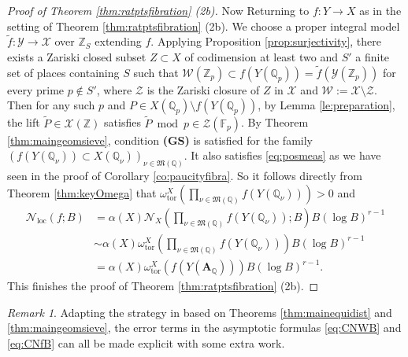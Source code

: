 \documentclass[11pt,letterpaper]{amsart}
\newcommand{\BF}{{\mathbb {F}}}
\newcommand{\BQ}{{\mathbb {Q}}}
\newcommand{\BZ}{{\mathbb {Z}}}
\newcommand{\CN}{{\mathcal {N}}}
\newcommand{\CW}{{\mathcal {W}}}
\newcommand{\CX}{{\mathcal {X}}}
\newcommand{\CY}{{\mathcal {Y}}}
\newcommand{\CZ}{{\mathcal {Z}}}
\newcommand{\RA}{{\mathbf {A}}}
\theoremstyle{plain}
\numberwithin{equation}{section}
\theoremstyle{definition}
\theoremstyle{remark}
\newtheorem{remark}[theorem]{Remark}
\begin{document}
\begin{proof}[Proof of Theorem \ref{thm:ratptsfibration} (2b)]
Now Returning to $f:Y\to X$ as in the setting of Theorem \ref{thm:ratptsfibration} (2b). We choose a proper integral model $\widetilde{f}:\CY\to\CX$ over $\BZ_S$ extending $f$.  Applying Proposition \ref{prop:surjectivity}, there exists a Zariski closed subset $Z\subset X$ of codimension at least two and $S'$ a finite set of places containing $S$ such that $\CW(\BZ_p)\subset f(Y(\BQ_p))=\widetilde{f}(\CY(\BZ_p))$ for every prime $p\notin S'$, where $\CZ$ is the Zariski closure of $Z$ in $\CX$ and $\CW :=\CX\setminus\CZ$. Then for any such $p$ and $P\in X(\BQ_p)\setminus f(Y(\BQ_p))$,  by Lemma \ref{le:preparation}, the lift $\widetilde{P}\in\CX(\BZ)$ satisfies $\widetilde{P}\bmod p\in\CZ(\BF_p)$. By Theorem \ref{thm:maingeomsieve}, condition \textbf{(GS)} is satisfied for the family $(f(Y(\BQ_\nu))\subset X(\BQ_\nu))_{\nu\in\mathfrak{M}(\BQ)}$. It also satisfies \eqref{eq:posmeas} as we have seen in the proof of Corollary \ref{co:paucityfibra}.	So it follows directly from  Theorem \ref{thm:keyOmega} that $\omega_{\operatorname{tor}}^X\left(\prod_{\nu\in\mathfrak{M}(\BQ)}f(Y(\BQ_\nu))\right)>0$ and
\begin{equation}\label{eq:CNfB}
	\begin{split}
		\CN_{\operatorname{loc}}(f;B)&=\alpha(X)\CN_X\left(\prod_{\nu\in\mathfrak{M}(\BQ)}f(Y(\BQ_\nu));B\right)B(\log B)^{r-1}\\
		&\sim \alpha(X)\omega_{\operatorname{tor}}^X\left(\prod_{\nu\in\mathfrak{M}(\BQ)}f(Y(\BQ_\nu))\right)B(\log B)^{r-1}\\ &=\alpha(X)\omega_{\operatorname{tor}}^X\left(f(Y(\RA_\BQ))\right)B(\log B)^{r-1}.
	\end{split}
\end{equation}
	This finishes the proof of Theorem \ref{thm:ratptsfibration} (2b). 
\end{proof}

\begin{remark}\label{rmk:effectivity} 
	Adapting the strategy in \cite[\S3]{Cao-Huang2} based on Theorems \ref{thm:mainequidist} and  \ref{thm:maingeomsieve}, the error terms in the asymptotic formulas \eqref{eq:CNWB} and \eqref{eq:CNfB} can all be made explicit with some extra work. \end{remark}
\end{document}
